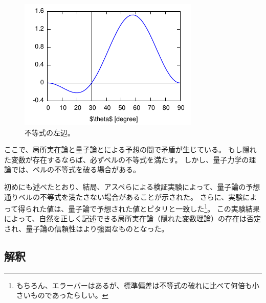 \documentclass[10pt,b5paper,papersize,dvipdfmx]{jsbook}
\begin{document}
\begin{figure}[htp]
  \centering
  \includegraphics{nkym/fig/Aspect.pdf}
  \caption{不等式の左辺。}
  \label{fig:left-hen}
\end{figure}

ここで、局所実在論と量子論とによる予想の間で矛盾が生じている。
もし隠れた変数が存在するならば、必ずベルの不等式を満たす。
しかし、量子力学の理論では、ベルの不等式を破る場合がある。

初めにも述べたとおり、結局、アスペらによる検証実験によって、量子論の予想通りベルの不等式を満たさない場合があることが示された。
さらに、実験によって得られた値は、量子論で予想された値とピタリと一致した\footnote{
  もちろん、エラーバーはあるが、標準偏差は不等式の破れに比べて何倍も小さいものであったらしい\cite{arafuna}。
}。
この実験結果によって、自然を正しく記述できる局所実在論（隠れた変数理論）の存在は否定され、量子論の信頼性はより強固なものとなった。

%
\subsection{解釈} \label{subsec:interpretation}%
\end{document}
